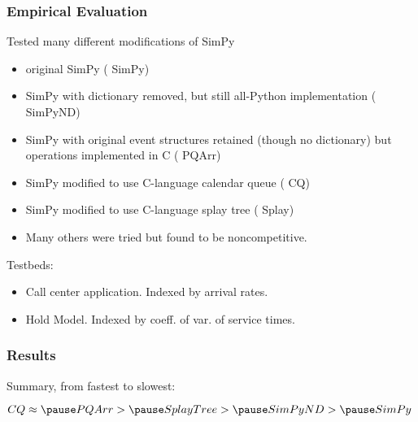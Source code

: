 \documentclass{beamer}
\begin{document}
\begin{frame}
\frametitle{Empirical Evaluation}

Tested many different modifications of SimPy

\begin{itemize}

\pause

\item original SimPy ({\color {blue} SimPy})

\pause

\item SimPy with dictionary removed, but still all-Python implementation
({\color{blue} SimPyND})

\pause

\item SimPy with original event structures retained (though no
dictionary) but operations  implemented in C ({\color{blue} PQArr})

\pause

\item SimPy modified to use C-language calendar queue
({\color{blue} CQ})

\pause

\item SimPy modified to use C-language splay tree
({\color{blue} Splay})

\pause

\item Many others were tried but found to be noncompetitive.

\end{itemize}

\pause

Testbeds:

\begin{itemize}

\item Call center application.  Indexed by arrival rates.

\item Hold Model.  Indexed by coeff. of var. of service times.
\end{itemize}

\end{frame}

\begin{frame}
\frametitle{Results}

Summary, from fastest to slowest:

\pause

$ CQ \approx \pause PQArr > \pause SplayTree > \pause SimPyND > \pause SimPy $

\end{frame}
\end{document}
